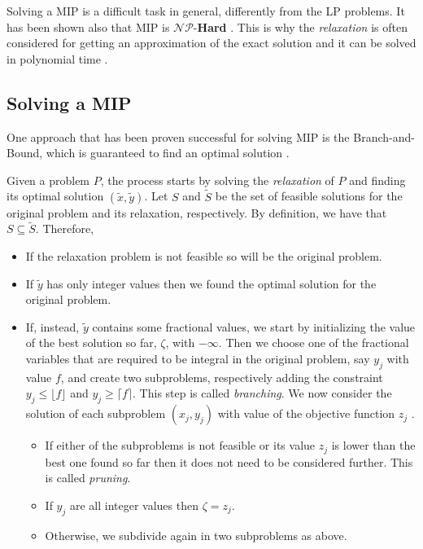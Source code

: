 Solving a \acrshort{MIP} is a difficult task in general, differently from the
\acrshort{LP} problems. It has been shown also that \acrshort{MIP} is
$\mathcal{NP}$-\textbf{Hard}
\cite{Kannan1978,Liberti2019,Schrijver1998}. This is why the \emph{relaxation} is often considered
for getting an approximation of the exact solution and it can be solved in
polynomial time \cite{Conforti2016}.

\subsection{Solving a MIP}%
\label{sub:solving_a_mip}

One approach that has been proven successful for solving \acrshort{MIP} is the
Branch-and-Bound, which is guaranteed to find an optimal solution
\cite{Conforti2016,Edgar2001}.

Given a problem $P$, the process starts by solving the \emph{relaxation} of $P$
and finding its optimal solution $(\tilde{x}, \tilde{y})$.
Let $S$ and  $\tilde{S}$ be the set of feasible solutions
for the original problem and its relaxation, respectively. By definition,
we have that $S \subseteq \tilde{S} $.
Therefore, \cite{Edgar2001}
\begin{itemize}
	\item If the relaxation problem is not feasible so will be the original
	      problem.
	\item If $\tilde{y}$ has only integer values then we found the optimal
	      solution for the original problem.
	\item If, instead, $\tilde{y}$ contains some fractional values, we start by
	      initializing the value of the best solution so far, $\zeta$, with
	      $-\infty$.  Then we choose one of the fractional variables that are
	      required to be integral in the original problem, say $y_j$ with
	      value $f$, and create two subproblems, respectively adding the
	      constraint $y_{j} \leq \lfloor f \rfloor$ and $y_{j} \geq \lceil f
		      \rceil$. This step is called \emph{branching}. We now consider the
	      solution of each subproblem $(x_j, y_j)$ with value of the objective
	      function $z_{j} $ \cite{Edgar2001,Conforti2016}.

	      \begin{itemize}
		      \item If either of the subproblems is not feasible or its value
		            $z_{j} $ is lower than the best one found so far then it does
		            not need to be considered further. This is called \emph{pruning}.
		      \item If $y_{j} $ are all integer values then $\zeta =
			            z_{j} $.
		      \item Otherwise, we subdivide again in two subproblems as
		            above.
	      \end{itemize}
\end{itemize}



